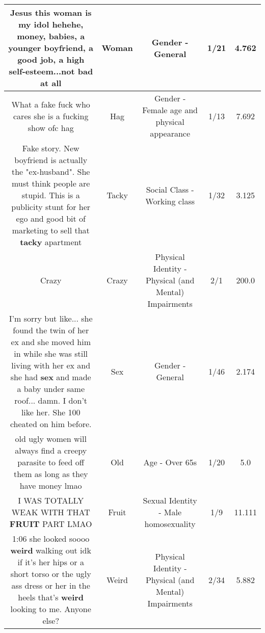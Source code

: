 \documentclass[11pt]{article}
\newlength\mylength
\begin{document}
\begin{center}
\begin{longtable}{|C{.65\mylength}|C{.30\mylength}|C{.12\mylength}|C{.12\mylength}|C{.12\mylength}|}
  \small Jesus this \textbf{woman} is my idol hehehe, money, babies, a younger boyfriend, a good job, a high self-esteem...not bad at all\normalsize   & Woman & Gender - General & 1/21 & 4.762 \\  \hline
  \small What a fake fuck who cares she is a fucking show ofc hag\normalsize   & Hag & Gender - Female age and physical appearance & 1/13 & 7.692 \\  \hline
  \small Fake story. New boyfriend is actually the "ex-husband". She must think people are stupid. This is a publicity stunt for her ego and good bit of marketing to sell that \textbf{tacky} apartment\normalsize   & Tacky & Social Class - Working class & 1/32 & 3.125 \\  \hline
  \small Crazy\normalsize   & Crazy & Physical Identity - Physical (and Mental) Impairments & 2/1 & 200.0 \\  \hline
  \small I'm sorry but like... she found the twin of her ex and she moved him in while she was still living with her ex and she had \textbf{sex} and made a baby under same roof... damn. I don't like her. She 100 cheated on him before.\normalsize   & Sex & Gender - General & 1/46 & 2.174 \\  \hline
  \small old ugly women will always find a creepy parasite to feed off them as long as they have money lmao\normalsize   & Old & Age - Over 65s & 1/20 & 5.0 \\  \hline
  \small I WAS TOTALLY WEAK WITH THAT \textbf{FRUIT} PART LMAO\normalsize   & Fruit & Sexual Identity - Male homosexuality & 1/9 & 11.111 \\  \hline
  \small \@ 1:06 she looked soooo \textbf{weird} walking out idk if it's her hips or a short torso or the ugly ass dress or her in the heels that's \textbf{weird} looking to me. Anyone else?\normalsize   & Weird & Physical Identity - Physical (and Mental) Impairments & 2/34 & 5.882 \\  \hline

\end{longtable}
\end{center}
\end{document}

